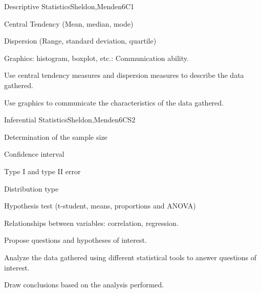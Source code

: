 \begin{syllabus}
\begin{unit}{Descriptive Statistics}{}{Sheldon,Menden}{6}{C1}
\begin{topics}
      \item Central Tendency (Mean, median, mode)
      \item Dispersion (Range, standard deviation, quartile)
      \item Graphics: histogram, boxplot, etc.: Communication ability.
   \end{topics}
   \begin{learningoutcomes}
      \item Use central tendency measures and dispersion measures to describe the data gathered.
      \item Use graphics to communicate the characteristics of the data gathered.
   \end{learningoutcomes}
\end{unit}

\begin{unit}{Inferential Statistics}{}{Sheldon,Menden}{6}{CS2}
\begin{topics}
      \item Determination of the sample size
      \item Confidence interval
      \item Type I and type II error
      \item Distribution type
      \item Hypothesis test (t-student, means, proportions and ANOVA)
      \item Relationships between variables: correlation, regression.
   \end{topics}

   \begin{learningoutcomes}
      \item Propose questions and hypotheses of interest.
      \item Analyze the data gathered using different statistical tools to answer questions of interest.
      \item Draw conclusions based on the analysis performed.
   \end{learningoutcomes}
\end{unit}





\begin{coursebibliography}
\end{coursebibliography}

\end{syllabus}
